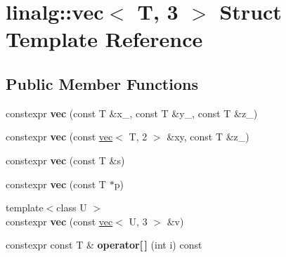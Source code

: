 \hypertarget{structlinalg_1_1vec_3_01T_00_013_01_4}{}\section{linalg\+:\+:vec$<$ T, 3 $>$ Struct Template Reference}
\label{structlinalg_1_1vec_3_01T_00_013_01_4}
\subsection*{Public Member Functions}
\begin{DoxyCompactItemize}
\item 
constexpr {\bfseries vec} (const T \&x\+\_\+, const T \&y\+\_\+, const T \&z\+\_\+)\hypertarget{structlinalg_1_1vec_3_01T_00_013_01_4_a11d5520a9cd15319aa70d44265f6cf80}{}\label{structlinalg_1_1vec_3_01T_00_013_01_4_a11d5520a9cd15319aa70d44265f6cf80}

\item 
constexpr {\bfseries vec} (const \hyperlink{structlinalg_1_1vec}{vec}$<$ T, 2 $>$ \&xy, const T \&z\+\_\+)\hypertarget{structlinalg_1_1vec_3_01T_00_013_01_4_a6daf245e5a32dd5b3caff0917ad15466}{}\label{structlinalg_1_1vec_3_01T_00_013_01_4_a6daf245e5a32dd5b3caff0917ad15466}

\item 
constexpr {\bfseries vec} (const T \&s)\hypertarget{structlinalg_1_1vec_3_01T_00_013_01_4_a981e20c50bc43f76a4c645ebd0b7ebb8}{}\label{structlinalg_1_1vec_3_01T_00_013_01_4_a981e20c50bc43f76a4c645ebd0b7ebb8}

\item 
constexpr {\bfseries vec} (const T $\ast$p)\hypertarget{structlinalg_1_1vec_3_01T_00_013_01_4_a2c5b0f06d4ce95a4ab028c0808089e08}{}\label{structlinalg_1_1vec_3_01T_00_013_01_4_a2c5b0f06d4ce95a4ab028c0808089e08}

\item 
{\footnotesize template$<$class U $>$ }\\constexpr {\bfseries vec} (const \hyperlink{structlinalg_1_1vec}{vec}$<$ U, 3 $>$ \&v)\hypertarget{structlinalg_1_1vec_3_01T_00_013_01_4_ab709d4d487e4b81e1455bfcdf479ed70}{}\label{structlinalg_1_1vec_3_01T_00_013_01_4_ab709d4d487e4b81e1455bfcdf479ed70}

\item 
constexpr const T \& {\bfseries operator\mbox{[}$\,$\mbox{]}} (int i) const \hypertarget{structlinalg_1_1vec_3_01T_00_013_01_4_a5dd2a0a961e299c28d2cd4199c2664e1}{}\label{structlinalg_1_1vec_3_01T_00_013_01_4_a5dd2a0a961e299c28d2cd4199c2664e1}


\end{DoxyCompactItemize}
